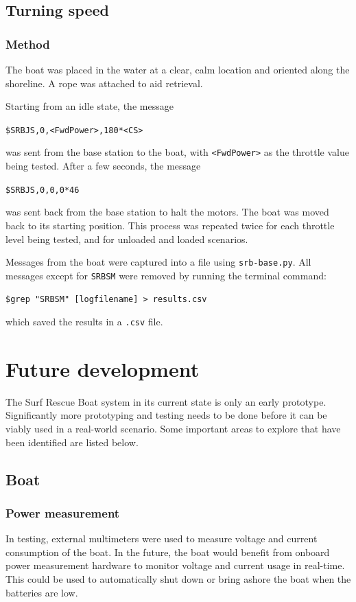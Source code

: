 \documentclass[a4paper]{IEEEtran}
\begin{document}
\subsection{Turning speed}

\subsubsection{Method}
The boat was placed in the water at a clear, calm location and oriented along the shoreline. A rope was attached to aid retrieval.

Starting from an idle state, the message
\begin{center}
\texttt{\$SRBJS,0,<FwdPower>,180*<CS>}
\end{center}
was sent from the base station to the boat, with \texttt{<FwdPower>} as the throttle value being tested. After a few seconds, the message
\begin{center}
\texttt{\$SRBJS,0,0,0*46}
\end{center}
was sent back from the base station to halt the motors. The boat was moved back to its starting position. This process was repeated twice for each throttle level being tested, and for unloaded and loaded scenarios.

Messages from the boat were captured into a file using \texttt{srb-base.py}. All messages except for \texttt{SRBSM} were removed by running the terminal command:
\begin{center}
\texttt{\$grep "SRBSM" [logfilename] > results.csv}
\end{center}
which saved the results in a \texttt{.csv} file.

\section{Future development}
The Surf Rescue Boat system in its current state is only an early prototype. Significantly more prototyping and testing needs to be done before it can be viably used in a real-world scenario. Some important areas to explore that have been identified are listed below.

\subsection{Boat}

\subsubsection{Power measurement}
In testing, external multimeters were used to measure voltage and current consumption of the boat. In the future, the boat would benefit from onboard power measurement hardware to monitor voltage and current usage in real-time. This could be used to automatically shut down or bring ashore the boat when the batteries are low.
\end{document}
